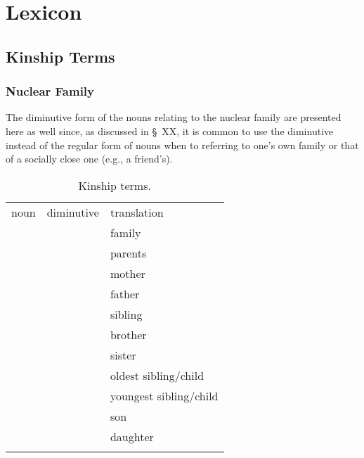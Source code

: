 \chapter{Lexicon}

\section{Kinship Terms}\label{sec:kinship terms}
\subsection{Nuclear Family}\label{sec:nuclear family}

The diminutive form of the nouns relating to the nuclear family are presented here as well since, as discussed in \S~XX, it is common to use the diminutive instead of the regular form of nouns when to referring to one's own family or that of a socially close one (e.g., a friend's).


\begin{table}[h!]
  \caption{Kinship terms.}
  \label{tbl:kinship}
  \centering\small
  \begin{tabu} to 0.8\textwidth{YYY[1.5]}
  \toprule\addlinespace
  {\sc noun}    & {\sc diminutive} & {\sc translation}\\\addlinespace
  \midrule\addlinespace
      &  & family\\\addlinespace
      &        & parents\\\addlinespace
      &      & mother\\\addlinespace
    &      & father\\\addlinespace
      &      & sibling\\\addlinespace
      &      & brother\\\addlinespace
      &      & sister\\\addlinespace
      &      & oldest sibling/child\\\addlinespace
      &      & youngest sibling/child\\\addlinespace
      &      & son\\\addlinespace
      &      & daughter\\\addlinespace
  \bottomrule

  \end{tabu}
\end{table}
